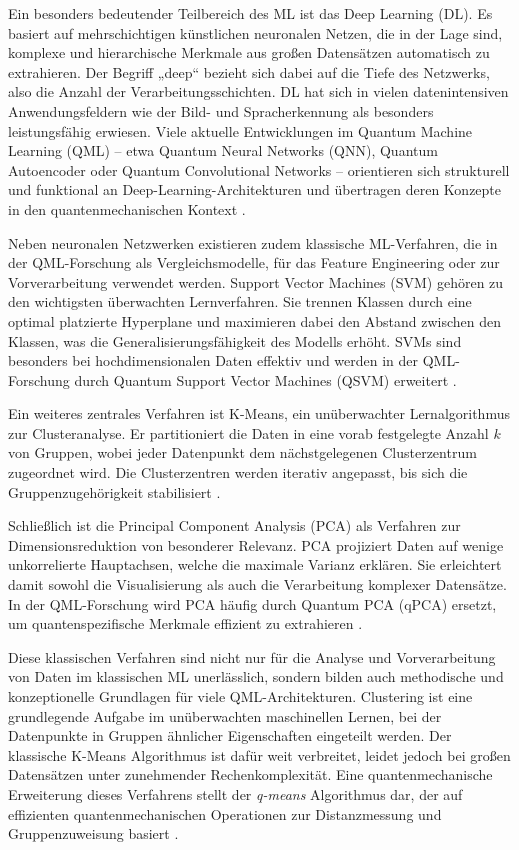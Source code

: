 Ein besonders bedeutender Teilbereich des ML ist das Deep Learning (DL). Es basiert auf mehrschichtigen künstlichen neuronalen Netzen, die in der Lage sind, komplexe und hierarchische Merkmale aus großen Datensätzen automatisch zu extrahieren. Der Begriff „deep“ bezieht sich dabei auf die Tiefe des Netzwerks, also die Anzahl der Verarbeitungsschichten. DL hat sich in vielen datenintensiven Anwendungsfeldern wie der Bild- und Spracherkennung als besonders leistungsfähig erwiesen. Viele aktuelle Entwicklungen im Quantum Machine Learning (QML) – etwa Quantum Neural Networks (QNN), Quantum Autoencoder oder Quantum Convolutional Networks – orientieren sich strukturell und funktional an Deep-Learning-Architekturen und übertragen deren Konzepte in den quantenmechanischen Kontext \cite{kreutzer2019}.  

Neben neuronalen Netzwerken existieren zudem klassische ML-Verfahren, die in der QML-Forschung als Vergleichsmodelle, für das Feature Engineering oder zur Vorverarbeitung verwendet werden. Support Vector Machines (SVM) gehören zu den wichtigsten überwachten Lernverfahren. Sie trennen Klassen durch eine optimal platzierte Hyperplane und maximieren dabei den Abstand zwischen den Klassen, was die Generalisierungsfähigkeit des Modells erhöht. SVMs sind besonders bei hochdimensionalen Daten effektiv und werden in der QML-Forschung durch Quantum Support Vector Machines (QSVM) erweitert \cite{janiesch2021}.  

Ein weiteres zentrales Verfahren ist K-Means, ein unüberwachter Lernalgorithmus zur Clusteranalyse. Er partitioniert die Daten in eine vorab festgelegte Anzahl $k$ von Gruppen, wobei jeder Datenpunkt dem nächstgelegenen Clusterzentrum zugeordnet wird. Die Clusterzentren werden iterativ angepasst, bis sich die Gruppenzugehörigkeit stabilisiert \cite{springer2021}.  

Schließlich ist die Principal Component Analysis (PCA) als Verfahren zur Dimensionsreduktion von besonderer Relevanz. PCA projiziert Daten auf wenige unkorrelierte Hauptachsen, welche die maximale Varianz erklären. Sie erleichtert damit sowohl die Visualisierung als auch die Verarbeitung komplexer Datensätze. In der QML-Forschung wird PCA häufig durch Quantum PCA (qPCA) ersetzt, um quantenspezifische Merkmale effizient zu extrahieren \cite{springer2021}.  

Diese klassischen Verfahren sind nicht nur für die Analyse und Vorverarbeitung von Daten im klassischen ML unerlässlich, sondern bilden auch methodische und konzeptionelle Grundlagen für viele QML-Architekturen. Clustering ist eine grundlegende Aufgabe im unüberwachten maschinellen Lernen, bei der Datenpunkte in Gruppen ähnlicher Eigenschaften eingeteilt werden. Der klassische K-Means Algorithmus ist dafür weit verbreitet, leidet jedoch bei großen Datensätzen unter zunehmender Rechenkomplexität. Eine quantenmechanische Erweiterung dieses Verfahrens stellt der \textit{q-means} Algorithmus dar, der auf effizienten quantenmechanischen Operationen zur Distanzmessung und Gruppenzuweisung basiert \cite{kerenidis2019}.  

